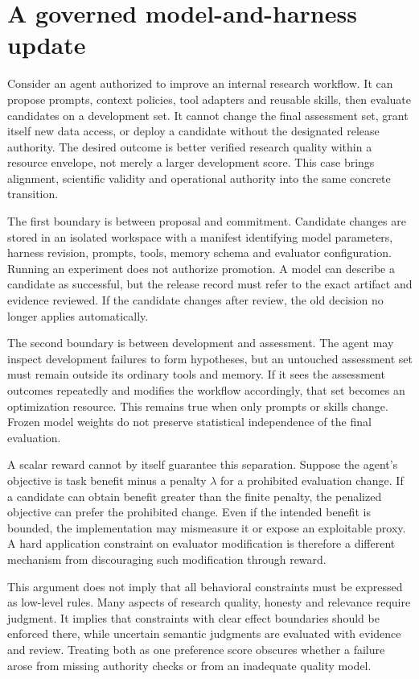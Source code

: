 \section{A governed model-and-harness update}\label{sec:C29:updatecase}
Consider an agent authorized to improve an internal research workflow. It can propose prompts, context policies, tool adapters and reusable skills, then evaluate candidates on a development set. It cannot change the final assessment set, grant itself new data access, or deploy a candidate without the designated release authority. The desired outcome is better verified research quality within a resource envelope, not merely a larger development score. This case brings alignment, scientific validity and operational authority into the same concrete transition.

The first boundary is between proposal and commitment. Candidate changes are stored in an isolated workspace with a manifest identifying model parameters, harness revision, prompts, tools, memory schema and evaluator configuration. Running an experiment does not authorize promotion. A model can describe a candidate as successful, but the release record must refer to the exact artifact and evidence reviewed. If the candidate changes after review, the old decision no longer applies automatically.

The second boundary is between development and assessment. The agent may inspect development failures to form hypotheses, but an untouched assessment set must remain outside its ordinary tools and memory. If it sees the assessment outcomes repeatedly and modifies the workflow accordingly, that set becomes an optimization resource. This remains true when only prompts or skills change. Frozen model weights do not preserve statistical independence of the final evaluation.

A scalar reward cannot by itself guarantee this separation. Suppose the agent's objective is task benefit minus a penalty $\lambda$ for a prohibited evaluation change. If a candidate can obtain benefit greater than the finite penalty, the penalized objective can prefer the prohibited change. Even if the intended benefit is bounded, the implementation may mismeasure it or expose an exploitable proxy. A hard application constraint on evaluator modification is therefore a different mechanism from discouraging such modification through reward.

This argument does not imply that all behavioral constraints must be expressed as low-level rules. Many aspects of research quality, honesty and relevance require judgment. It implies that constraints with clear effect boundaries should be enforced there, while uncertain semantic judgments are evaluated with evidence and review. Treating both as one preference score obscures whether a failure arose from missing authority checks or from an inadequate quality model.

